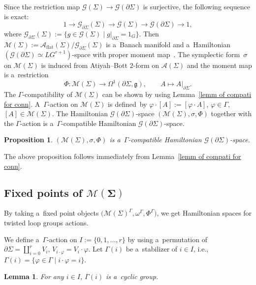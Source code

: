 \documentclass[pdftex]{sigma}
\numberwithin{equation}{section}
\newtheorem{Lemma}[Theorem]{Lemma}
\newtheorem{Proposition}[Theorem]{Proposition}
\theoremstyle{definition}
\begin{document}
Since the restriction map $\mathcal{G}(\Sigma) \to \mathcal{G}(\partial \Sigma)$ is surjective,
the following sequence is exact:
\[ 1 \to \mathcal{G}_{\partial \Sigma}(\Sigma) \to \mathcal{G}(\Sigma) \to \mathcal{G}(\partial \Sigma) \to 1,
\]
where $\mathcal{G}_{\partial \Sigma}(\Sigma) := \{g \in \mathcal{G}(\Sigma)\mid g|_{\partial \Sigma} =1_G\}$.
Then $\mathcal{M}(\Sigma) := \mathcal{A}_{\mathrm{flat}}(\Sigma) / \mathcal{G}_{\partial \Sigma}(\Sigma)$ is a~Banach manifold and a~Hamiltonian $(\mathcal{G}(\partial \Sigma) \simeq LG^{r+1})$-space with proper moment map~\cite{AMM,Donaldson1992}.
The symplectic form~$\sigma$ on $\mathcal{M}(\Sigma)$ is induced from Atiyah--Bott $2$-form on $\mathcal{A}(\Sigma)$ and the moment map is a~restriction
\[
\Phi \colon \mathcal{M}(\Sigma) \to \Omega^1(\partial \Sigma, \mathfrak{g}),\qquad A \mapsto A|_{\partial \Sigma}.
\]
The $\Gamma$-compatibility of $\mathcal{M}(\Sigma)$ can be shown by using Lemma~\ref{lemm of compati for conn}. A~$\Gamma$-action on $\mathcal{M}(\Sigma)$ is defined~by
$\varphi \cdot [A] := [\varphi \cdot A]$, $ \varphi \in \Gamma$, $ [A] \in \mathcal{M}(\Sigma)$.
The Hamiltonian $\mathcal{G}(\partial \Sigma)$-space $(\mathcal{M}(\Sigma), \sigma, \Phi)$ together with the $\Gamma$-action is a~$\Gamma$-compatible Hamiltonian $\mathcal{G}(\partial \Sigma)$-space.

\begin{Proposition}
 $(\mathcal{M}(\Sigma),\sigma,\Phi)$ is a~$\Gamma$-compatible Hamiltonian $\mathcal{G}(\partial \Sigma)$-space.
\end{Proposition}
The above proposition follows immediately from Lemma~\ref{lemm of compati for conn}.

\subsection[Fixed points of M(Sigma)]{Fixed points of $\boldsymbol{\mathcal{M}(\Sigma)}$}

By taking a~fixed point objects $\bigl(\mathcal{M}(\Sigma)^{\Gamma},\omega^{\Gamma},\Phi^{\Gamma}\bigr)$, we get Hamiltonian spaces for twisted loop groups actions.

We define a~$\Gamma$-action on $I := \{ 0,1,\dots,r\}$ by using a~permutation of $\partial \Sigma = \coprod _{i=0}^{r} V_i$,
$V_{i \cdot \varphi } = V_{i} \cdot \varphi$.
Let $\Gamma(i) $ be a~stabilizer of $i \in I$, i.e., $\Gamma(i) = \{\varphi \in \Gamma\mid i \cdot \varphi = i\}$.

\begin{Lemma}
 For any $i \in I$, $\Gamma(i)$ is a~cyclic group.
\end{Lemma}
\end{document}
